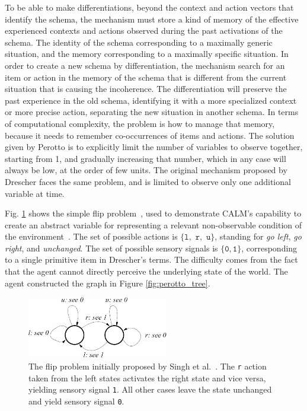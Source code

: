 \documentclass[runningheads]{llncs}
\begin{document}
To be able to make differentiations, beyond the context and action vectors that identify the schema, the mechanism must store a kind of memory of the effective experienced contexts and actions observed during the past activations of the schema.
The identity of the schema corresponding to a maximally generic situation, and the memory corresponding to a maximally specific situation.
In order to create a new schema by differentiation, the mechanism search for an item or action in the memory of the schema that is different from the current situation that is causing the incoherence. 
The differentiation will preserve the past experience in the old schema, identifying it with a more specialized context or more precise action, separating the new situation in another schema.
In terms of computational complexity, the problem is how to manage that memory, because it needs to remember co-occurrences of items and actions.
The solution given by Perotto is to explicitly limit the number of variables to observe together, starting from 1, and gradually increasing that number, which in any case will always be low, at the order of few units.
The original mechanism proposed by Drescher faces the same problem, and is limited to observe only one additional variable at time.

Fig. \ref{fig:perotto_ben} shows the simple flip problem~\cite{Singh:2003:ICML}, used to demonstrate CALM's capability to create an abstract variable for representing a relevant non-observable condition of the environment~\cite{Perotto:2007:EpiRob}.
The set of possible actions is $\{\texttt{l},$ $\texttt{r},$ $\texttt{u}\}$, standing for \textit{go left}, \textit{go right}, and \textit{unchanged}.
The set of possible sensory signals is $\{\texttt{0}, \texttt{1}\}$, corresponding to a single primitive item in Drescher's terms.
The difficulty comes from the fact that the agent cannot directly perceive the underlying state of the world. 
The agent constructed the graph in Figure \ref{fig:perotto_tree}. 

\begin{figure}
	\centering
	\includegraphics[width=0.55\textwidth]{Figure_flip_problem.png}
	\caption{The flip problem initially proposed by Singh et al.~\cite{Singh:2003:ICML}.
	The \texttt{r} action taken from the left states activates the right state and vice versa, yielding sensory signal \texttt{1}.
	All other cases leave the state unchanged and yield sensory signal \texttt{0}.
} 
	\label{fig:perotto_ben}
\end{figure}
\end{document}

